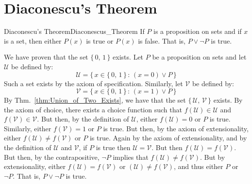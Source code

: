 \documentclass[crop=false,class=article]{standalone}                           %
\begin{document}
    \section{Diaconescu's Theorem}
        \begin{ftheorem}{Diaconescu's Theorem}{Diaconescus_Theorem}
            If $P$ is a proposition on sets and if $x$ is a set, then either
            $P(x)$ is true or $P(x)$ is false. That is, $P\lor\neg{P}$ is true.
        \end{ftheorem}
        \begin{bproof}
            We have proven that the set $\{\,0,\,1\,\}$ exists. Let $P$ be a
            proposition on sets and let $\mathcal{U}$ be defined by:
            \begin{equation}
                \mathcal{U}=\{\,x\in\{\,0,\,1\,\}\,:\,(x=0)\lor{P}\,\}
            \end{equation}
            Such a set exists by the axiom of specification. Similarly, let
            $\mathcal{V}$ be defined by:
            \begin{equation}
                \mathcal{V}=\{\,x\in\{\,0,\,1\,\}\,:\,(x=1)\lor{P}\,\}
            \end{equation}
            By Thm.~\ref{thm:Union_of_Two_Exists}, we have that the set
            $\{\,\mathcal{U},\,\mathcal{V}\,\}$ exists. By the axiom of
            choice, there exists a choice function such that
            $f(\mathcal{U})\in\mathcal{U}$ and $f(\mathcal{V})\in\mathcal{V}$.
            But then, by the definition of $\mathcal{U}$, either
            $f(\mathcal{U})=0$ or $P$ is true. Similarly, either
            $f(\mathcal{V})=1$ or $P$ is true. But then, by the axiom of
            extensionality, either $f(\mathcal{U})\ne{f}(\mathcal{V})$ or
            $P$ is true. Again by the axiom of extensionality, and by the
            definition of $\mathcal{U}$ and $\mathcal{V}$, if $P$ is true
            then $\mathcal{U}=\mathcal{V}$. But then
            $f(\mathcal{U})=f(\mathcal{V})$. But then, by the contrapositive,
            $\neg{P}$ implies that $f(\mathcal{U})\ne{f}(\mathcal{V})$. But
            by extensionality, either $f(\mathcal{U})=f(\mathcal{V})$ or
            $(\mathcal{U})\ne{f}(\mathcal{V})$, and thus either $P$ or
            $\neg{P}$. That is, $P\lor\neg{P}$ is true.
        \end{bproof}
\end{document}
